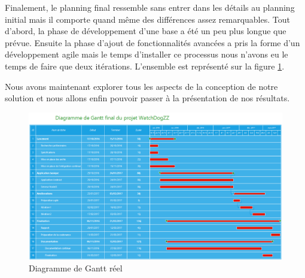 Finalement, le planning final ressemble sans entrer dans les détails au planning initial mais il comporte quand même des différences assez remarquables. Tout d’abord, la phase de développement d’une base a été un peu plus longue que prévue. Ensuite la phase d’ajout de fonctionnalités avancées a pris la forme d’un développement agile mais le temps d’installer ce processus nous n’avons eu le temps de faire que deux itérations. L’ensemble est représenté sur la figure \ref{ganttfinal}.

Nous avons maintenant explorer tous les aspects de la conception de notre solution et nous allons enfin pouvoir passer à la présentation de nos résultats.

\begin{landscape}
    \begin{figure}[h]
        \centering
        \includegraphics[height=\textwidth]{../gantt_final.png}
        \caption{Diagramme de Gantt réel}
        \label{ganttfinal}
    \end{figure}
\end{landscape}

